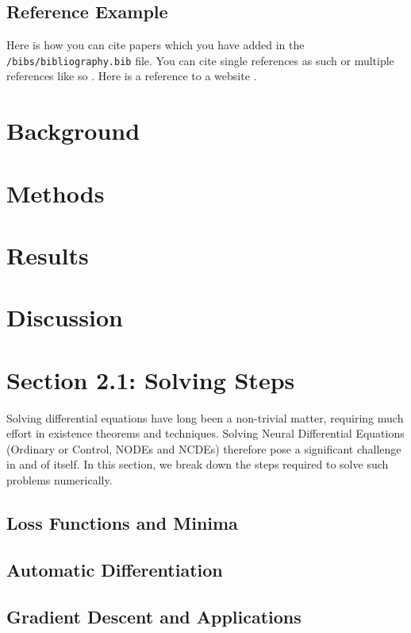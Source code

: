 \documentclass[a4paper,11pt, titlepage]{article}
\theoremstyle{definition}
\theoremstyle{plain}
\theoremstyle{remark}
\begin{document}
\subsection{Reference Example}

Here is how you can cite papers which you have added in the \verb!/bibs/bibliography.bib! file. You can cite single references as such \cite{Einstein1905} or multiple references like so \cite{Dirac1981,Einstein1905}. Here is a reference to a website \cite{Riemann2024}.

\section{Background}

\section{Methods}

\section{Results}

\section{Discussion}

\section{Section 2.1: Solving Steps}
Solving differential equations have long been a non-trivial matter, requiring much effort in existence theorems and techniques. Solving Neural Differential Equations (Ordinary or Control, NODEs and NCDEs) therefore pose a significant challenge in and of itself. In this section, we break down the steps required to solve such problems numerically.


\subsection{Loss Functions and Minima}

\subsection{Automatic Differentiation}


\subsection{Gradient Descent and Applications}
\end{document}
